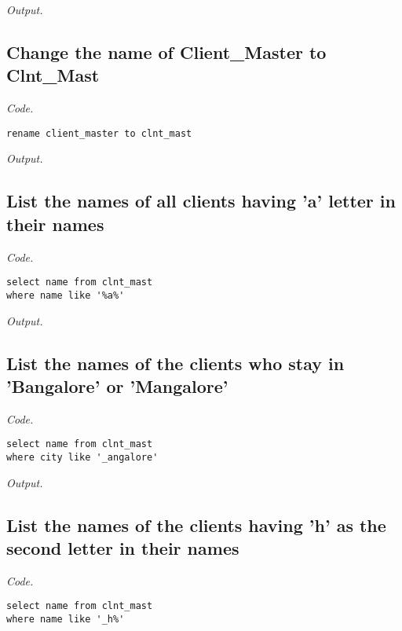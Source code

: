 \documentclass[12pt]{article}
\begin{document}
\textit{Output.}\\

\subsection{Change the name of Client\_Master to Clnt\_Mast}

\textit{Code.}

\begin{lstlisting}
rename client_master to clnt_mast
\end{lstlisting}

\textit{Output.}\\

\subsection{List the names of all clients having 'a' letter in their names}

\textit{Code.}

\begin{lstlisting}
select name from clnt_mast
where name like '%a%'
\end{lstlisting}

\textit{Output.}\\

\subsection{List the names of the clients who stay in 'Bangalore' or 'Mangalore'}

\textit{Code.}

\begin{lstlisting}
select name from clnt_mast
where city like '_angalore'
\end{lstlisting}

\textit{Output.}\\

\subsection{List the names of the clients having 'h' as the second letter in their names}

\textit{Code.}

\begin{lstlisting}
select name from clnt_mast
where name like '_h%'
\end{lstlisting}
\end{document}

